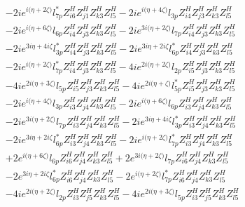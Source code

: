 \begin{align}
 &-2 i e^{i \Big(\eta +2 \zeta \Big)} l_{7p}^* Z_{{i 6}}^{H} Z_{{j 1}}^{H} Z_{{k 3}}^{H} Z_{{l 5}}^{H} -2 i e^{i \Big(\eta +4 \zeta \Big)} l_{3p} Z_{{i 4}}^{H} Z_{{j 3}}^{H} Z_{{k 3}}^{H} Z_{{l 5}}^{H} \nonumber \\ 
 &-2 i e^{i \Big(\eta +6 \zeta \Big)} l_{6p} Z_{{i 4}}^{H} Z_{{j 3}}^{H} Z_{{k 3}}^{H} Z_{{l 5}}^{H} -2 i e^{3 i \Big(\eta +2 \zeta \Big)} l_{7p} Z_{{i 4}}^{H} Z_{{j 3}}^{H} Z_{{k 3}}^{H} Z_{{l 5}}^{H} \nonumber \\ 
 &-2 i e^{3 i \eta +4 i \zeta } l_{3p}^* Z_{{i 4}}^{H} Z_{{j 3}}^{H} Z_{{k 3}}^{H} Z_{{l 5}}^{H} -2 i e^{3 i \eta +2 i \zeta } l_{6p}^* Z_{{i 4}}^{H} Z_{{j 3}}^{H} Z_{{k 3}}^{H} Z_{{l 5}}^{H} \nonumber \\ 
 &-2 i e^{i \Big(\eta +2 \zeta \Big)} l_{7p}^* Z_{{i 4}}^{H} Z_{{j 3}}^{H} Z_{{k 3}}^{H} Z_{{l 5}}^{H} -4 i e^{2 i \Big(\eta +2 \zeta \Big)} l_{2p} Z_{{i 5}}^{H} Z_{{j 3}}^{H} Z_{{k 3}}^{H} Z_{{l 5}}^{H} \nonumber \\ 
 &-4 i e^{2 i \Big(\eta +3 \zeta \Big)} l_{5p} Z_{{i 5}}^{H} Z_{{j 3}}^{H} Z_{{k 3}}^{H} Z_{{l 5}}^{H} -4 i e^{2 i \Big(\eta +\zeta \Big)} l_{5p}^* Z_{{i 5}}^{H} Z_{{j 3}}^{H} Z_{{k 3}}^{H} Z_{{l 5}}^{H} \nonumber \\ 
 &-2 i e^{i \Big(\eta +4 \zeta \Big)} l_{3p} Z_{{i 3}}^{H} Z_{{j 4}}^{H} Z_{{k 3}}^{H} Z_{{l 5}}^{H} -2 i e^{i \Big(\eta +6 \zeta \Big)} l_{6p} Z_{{i 3}}^{H} Z_{{j 4}}^{H} Z_{{k 3}}^{H} Z_{{l 5}}^{H} \nonumber \\ 
 &-2 i e^{3 i \Big(\eta +2 \zeta \Big)} l_{7p} Z_{{i 3}}^{H} Z_{{j 4}}^{H} Z_{{k 3}}^{H} Z_{{l 5}}^{H} -2 i e^{3 i \eta +4 i \zeta } l_{3p}^* Z_{{i 3}}^{H} Z_{{j 4}}^{H} Z_{{k 3}}^{H} Z_{{l 5}}^{H} \nonumber \\ 
 &-2 i e^{3 i \eta +2 i \zeta } l_{6p}^* Z_{{i 3}}^{H} Z_{{j 4}}^{H} Z_{{k 3}}^{H} Z_{{l 5}}^{H} -2 i e^{i \Big(\eta +2 \zeta \Big)} l_{7p}^* Z_{{i 3}}^{H} Z_{{j 4}}^{H} Z_{{k 3}}^{H} Z_{{l 5}}^{H} \nonumber \\ 
 &+2 e^{i \Big(\eta +6 \zeta \Big)} l_{6p} Z_{{i 6}}^{H} Z_{{j 4}}^{H} Z_{{k 3}}^{H} Z_{{l 5}}^{H} +2 e^{3 i \Big(\eta +2 \zeta \Big)} l_{7p} Z_{{i 6}}^{H} Z_{{j 4}}^{H} Z_{{k 3}}^{H} Z_{{l 5}}^{H} \nonumber \\ 
 &-2 e^{3 i \eta +2 i \zeta } l_{6p}^* Z_{{i 6}}^{H} Z_{{j 4}}^{H} Z_{{k 3}}^{H} Z_{{l 5}}^{H} -2 e^{i \Big(\eta +2 \zeta \Big)} l_{7p}^* Z_{{i 6}}^{H} Z_{{j 4}}^{H} Z_{{k 3}}^{H} Z_{{l 5}}^{H} \nonumber \\ 
 &-4 i e^{2 i \Big(\eta +2 \zeta \Big)} l_{2p} Z_{{i 3}}^{H} Z_{{j 5}}^{H} Z_{{k 3}}^{H} Z_{{l 5}}^{H} -4 i e^{2 i \Big(\eta +3 \zeta \Big)} l_{5p} Z_{{i 3}}^{H} Z_{{j 5}}^{H} Z_{{k 3}}^{H} Z_{{l 5}}^{H} \nonumber \\ 

\end{align}

